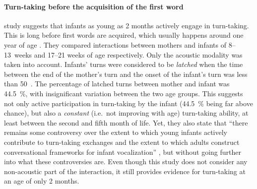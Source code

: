 \paragraph{Turn-taking before the acquisition of the first word}
 study suggests that infants as young as 2 months actively engage in turn-taking.
This is long before first words are acquired, which usually happens around one year of age \citep[, ]{lenneberg_biological_1967,szagun_sprachentwicklung_2013}.
They compared interactions between mothers and infants of 8--13~weeks and 17--21 weeks of age respectively.
Only the acoustic modality was taken into account.
Infants' turns were considered to be \emph{latched} when the time between the end of the mother's turn and the onset of the infant's turn was less than 50~\ms.
The percentage of latched turns between mother and infant was 44.5~\%, with insignificant variation between the two age groups.
This suggests not only active participation in turn-taking by the infant (44.5~\% being far above chance), but also a \emph{constant} (i.e.\ not improving with age) turn-taking ability, at least between the second and fifth month of life.
Yet, they also state that ``there remains some controversy over the extent to which young infants actively contribute to turn-taking exchanges and the extent to which adults construct conversational frameworks for infant vocalization'' \citep[]{gratier_early_2015}, but without going further into what these controversies are.
Even though this study does not consider any non-acoustic part of the interaction, it still provides evidence for turn-taking at an age of only 2 months.

